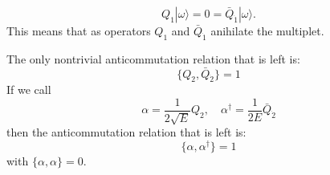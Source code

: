 \begin{equation}
  Q_1|\omega\rangle = 0 = \bar{Q}_{\dot{1}}|\omega\rangle.
\end{equation}
This means that as operators $Q_1$ and $\bar{Q}_{\dot{1}}$ anihilate the
multiplet. 
\par The only nontrivial anticommutation relation that is left is:
\begin{equation}
  \{Q_2,\bar{Q}_{\dot{2}}\} = 1
\end{equation}
If we call
\begin{equation}
  \alpha = \frac{1}{2\sqrt{E}}Q_2,\quad \alpha^\dagger
  = \frac{1}{2E}\bar{Q}_{\dot{2}}
\end{equation}
then the anticommutation relation that is left is:
\begin{equation}
  \{\alpha,\alpha^\dagger\} = 1
\end{equation}
with $\{\alpha,\alpha\} = 0$.

